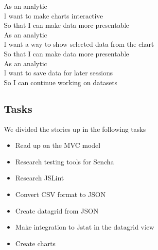 As an analytic \\
I want to make charts interactive  \\
So that I can make data more presentable \\

As an analytic \\
I want a way to show selected data from the chart \\
So that I can make data more presentable\\

As an analytic \\
I want to save data for later sessions \\
So I can continue working on datasets \\

\subsection{Tasks} %
\label{sub:Tasks}
We divided the stories up in the following tasks
\begin{itemize}
	\item Read up on the MVC model
	\item Research testing tools for Sencha
	\item Research JSLint
	\item Convert CSV format to JSON
	\item Create datagrid from JSON
	\item Make integration to Jstat in the datagrid view
	\item Create charts
\end{itemize}










